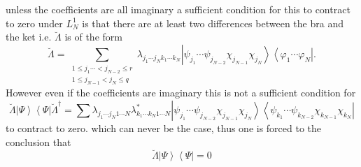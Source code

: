 \documentclass[aps,preprint]{revtex4}%
\begin{document}
unless the coefficients are all imaginary a sufficient condition for this to
contract to zero under $L_{N}^{1}$ is that there are at least two differences
between the bra and the ket i.e. $\breve{\Lambda}$ is of the form
\begin{equation}
\breve{\Lambda}=\sum_{\substack{1\leq j_{1}\cdots<j_{N-2}\leq r\\1\leq
j_{N-1}<j_{N}\leq q}}\lambda_{j_{1}\cdots j_{N}k_{1}\cdots k_{N}}\left\vert
\psi_{j_{1}}\cdots\psi_{j_{N-2}}\chi_{j_{N-1}}\chi_{j_{N}}\right\rangle
\left\langle \varphi_{1}\cdots\varphi_{N}\right\vert .
\end{equation}
However even if the coefficients are imaginary this is not a sufficient
condition for
\begin{equation}
\breve{\Lambda}\left\vert \Psi\right\rangle \left\langle \Psi\right\vert
\breve{\Lambda}^{\dagger}=\sum\lambda_{j_{1}\cdots j_{N}1\cdots N}%
\lambda_{k_{1}\cdots k_{N}1\cdots N}^{\ast}\left\vert \psi_{j_{1}}\cdots
\psi_{j_{N-2}}\chi_{j_{N-1}}\chi_{j_{N}}\right\rangle \left\langle \psi
_{k_{1}}\cdots\psi_{k_{N-2}}\chi_{k_{N-1}}\chi_{k_{N}}\right\vert
\end{equation}
to contract to zero. which can never be the case, thus one is forced to the
conclusion that
\begin{equation}
\breve{\Lambda}\left\vert \Psi\right\rangle \left\langle \Psi\right\vert =0
\end{equation}
\end{document}
